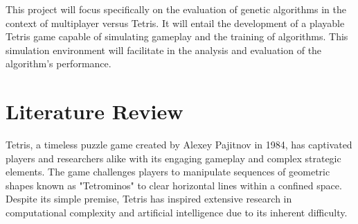 \documentclass[a4paper, 12pt]{extreport}
\begin{document}
	
	This project will focus specifically on the evaluation of genetic algorithms in the context of multiplayer versus Tetris. It will entail the development of a playable Tetris game capable of simulating gameplay and the training of algorithms. This simulation environment will facilitate in the analysis and evaluation of the algorithm's performance.	
	
	
	
	\chapter{Literature Review}
	
	
	
	Tetris, a timeless puzzle game created by Alexey Pajitnov in 1984, has captivated players and researchers alike with its engaging gameplay and complex strategic elements. The game challenges players to manipulate sequences of geometric shapes known as "Tetrominos" to clear horizontal lines within a confined space. Despite its simple premise, Tetris has inspired extensive research in computational complexity and artificial intelligence due to its inherent difficulty.
	
\end{document}
